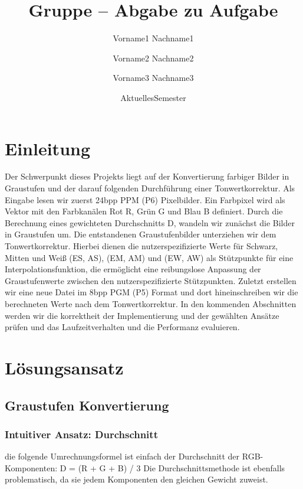 \documentclass[course=erap]{aspdoc}
\author{Vorname1 Nachname1 \and Vorname2 Nachname2 \and Vorname3 Nachname3}
\date{AktuellesSemester} %
\title{Gruppe \theGroup{} -- Abgabe zu Aufgabe \theNumber}
\begin{document}
\maketitle

\section{Einleitung}
Der Schwerpunkt dieses Projekts liegt auf der Konvertierung farbiger Bilder in Graustufen und der darauf folgenden Durchführung einer Tonwertkorrektur. 
Als Eingabe lesen wir zuerst 24bpp PPM (P6) Pixelbilder. Ein Farbpixel wird als Vektor mit den Farbkanälen Rot R, Grün G und Blau B definiert.
Durch die Berechnung eines gewichteten Durchschnitts D, wandeln wir zunächst die Bilder in Graustufen um. Die entstandenen Graustufenbilder unterziehen wir dem Tonwertkorrektur. 
Hierbei dienen die nutzerspezifizierte Werte für Schwarz, Mitten und Weiß (ES, AS), (EM, AM) und (EW, AW) als Stützpunkte für eine Interpolationsfunktion, die ermöglicht eine reibungslose Anpassung der Graustufenwerte zwischen den nutzerspezifizierte Stützpunkten. 
Zuletzt erstellen wir eine neue Datei im 8bpp PGM (P5) Format und dort hineinschreiben wir die berechneten Werte nach dem Tonwertkorrektur.
In den kommenden Abschnitten werden wir die korrektheit der Implementierung und der gewählten Ansätze prüfen und das Laufzeitverhalten und die Performanz evaluieren.

\section{Lösungsansatz}
\subsection{Graustufen Konvertierung}

\subsubsection{Intuitiver Ansatz: Durchschnitt}
die folgende Umrechnungsformel ist einfach der Durchschnitt der RGB-Komponenten:
D = (R + G + B) / 3 
Die Durchschnittsmethode ist ebenfalls problematisch, da sie jedem Komponenten den gleichen Gewicht zuweist.
\end{document}
